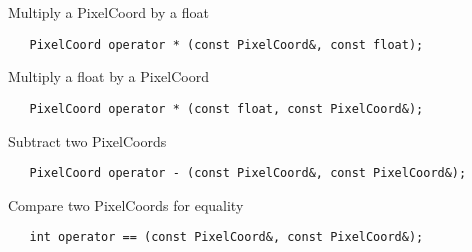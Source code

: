  Multiply a PixelCoord by a float
\begin{verbatim}
   PixelCoord operator * (const PixelCoord&, const float);
\end{verbatim}

 Multiply a float by a PixelCoord 
\begin{verbatim}
   PixelCoord operator * (const float, const PixelCoord&);
\end{verbatim}

 Subtract two PixelCoords
\begin{verbatim}
   PixelCoord operator - (const PixelCoord&, const PixelCoord&);
\end{verbatim}

 Compare two PixelCoords for equality
\begin{verbatim}
   int operator == (const PixelCoord&, const PixelCoord&);
\end{verbatim}

